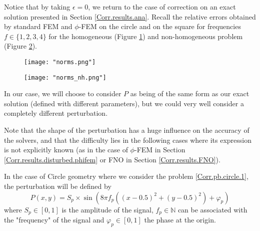 \begin{Rem}
	Notice that by taking $\epsilon=0$, we return to the case of correction on an exact solution presented in Section \ref{Corr.results.ana}. Recall the relative errors obtained by standard FEM and $\phi$-FEM on the circle and on the square for frequencies $f\in\{1,2,3,4\}$ for the homogeneous  (Figure \ref{norms}) and non-homogeneous problem  (Figure \ref{norms_nh}).
	
	\begin{minipage}{0.48\linewidth}
		\begin{figure}[H]
			\centering
			\texttt{[image: "norms.png"]}
			\label{norms}
		\end{figure} 
	\end{minipage}
	\begin{minipage}{0.48\linewidth}
		\begin{figure}[H]
			\centering
			\texttt{[image: "norms\_nh.png"]}
			\label{norms_nh}
		\end{figure} 
	\end{minipage}
\end{Rem}

In our case, we will choose to consider $P$ as being of the same form as our exact solution (defined with different parameters), but we could very well consider a completely different perturbation. 

\begin{Rem}
	Note that the shape of the perturbation has a huge influence on the accuracy of the solvers, and that the difficulty lies in the following cases where its expression is not explicitly known (as in the case of $\phi$-FEM in Section \ref{Corr.results.disturbed.phifem} or FNO in Section \ref{Corr.results.FNO}).
\end{Rem}

In the case of Circle geometry where we consider the problem \ref{Corr.pb.circle.1}, the perturbation will be defined by
\begin{equation*}
	P(x,y)=S_p\times\sin\left(8\pi f_p\left((x-0.5)^2+(y-0.5)^2\right)+\varphi_p\right)
\end{equation*}
where $S_p\in[0,1]$ is the amplitude of the signal, $f_p\in\mathbb{N}$ can be associated with the "frequency" of the signal and $\varphi_p\in[0,1]$ the phase at the origin.

